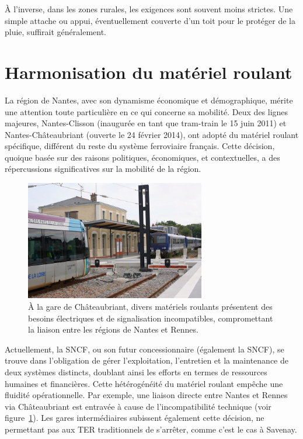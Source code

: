 À l'inverse, dans les zones rurales, les exigences sont souvent moins
strictes. Une simple attache ou appui, éventuellement couverte d'un
toit pour le protéger de la pluie, suffirait généralement.


\section{Harmonisation du matériel roulant}

La région de Nantes, avec son dynamisme économique et démographique,
mérite une attention toute particulière en ce qui concerne sa
mobilité. Deux des lignes majeures, Nantes-Clisson (inaugurée en tant
que tram-train le 15 juin 2011) et Nantes-Châteaubriant (ouverte le 24
février 2014), ont adopté du matériel roulant spécifique, différent du
reste du système ferroviaire français. Cette décision, quoique basée
sur des raisons politiques, économiques, et contextuelles, a des
répercussions significatives sur la mobilité de la région.

\begin{figure}[ht]
  \centering
  \includegraphics[width=0.7\textwidth]{images/gare-chateaubriant-1.jpg}
  \caption{À la gare de Châteaubriant, divers matériels roulants
    présentent des besoins électriques et de signalisation
    incompatibles, compromettant la liaison entre les régions de
    Nantes et Rennes.}
  \label{fig:chateaubriant}
\end{figure}

Actuellement, la SNCF, ou son futur concessionnaire (également la
SNCF), se trouve dans l'obligation de gérer l'exploitation,
l'entretien et la maintenance de deux systèmes distincts, doublant
ainsi les efforts en termes de ressources humaines et
financières. Cette hétérogénéité du matériel roulant empêche une
fluidité opérationnelle. Par exemple, une liaison directe entre Nantes
et Rennes via Châteaubriant est entravée à cause de l'incompatibilité
technique (voir figure~\ref{fig:chateaubriant}). Les gares intermédiaires
subissent également cette décision, ne permettant pas aux TER
traditionnels de s'arrêter, comme c'est le cas à Savenay.

